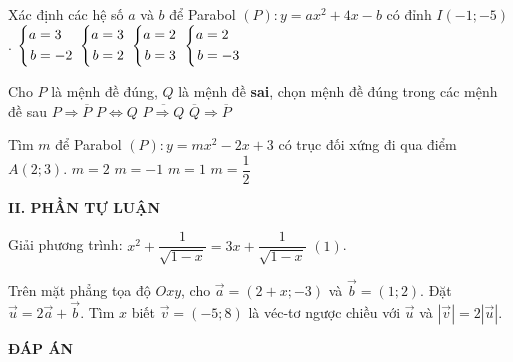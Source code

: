 \begin{ex}%
        Xác định các hệ số $a$ và $b$ để Parabol $(P): y= ax^2+4x-b$ có đỉnh $I(-1;-5)$.
        \choice        
        {$\left\{\begin{aligned}a&=3\\ b&=-2\end{aligned}\right.$}
        {$\left\{\begin{aligned}a&=3\\ b&=2\end{aligned}\right.$}
        {\True $\left\{\begin{aligned}a&=2\\ b&=3\end{aligned}\right.$}
        {$\left\{\begin{aligned}a&=2\\ b&=-3\end{aligned}\right.$}
\end{ex}
\begin{ex}%
        Cho $P$ là mệnh đề đúng, $Q$ là mệnh đề {\bf sai}, chọn mệnh đề đúng trong các mệnh đề sau
        \choice        
        {$P\Rightarrow \overline{P}$}
        {$P\Leftrightarrow Q$}
        {\True $\overline{P\Rightarrow Q}$}
        {$\overline{Q}\Rightarrow \overline{P}$}
\end{ex}
\begin{ex}%
        Tìm $m$ để Parabol $(P): y = mx^2-2x+3$ có trục đối xứng đi qua điểm $A(2;3)$.
        \choice        
        {$m=2$}
        {$m=-1$}
        {$m=1$}
        {\True $m=\dfrac{1}{2}$}
\end{ex}

\noindent\textbf{II. PHẦN TỰ LUẬN}
\begin{bt}
	Giải phương trình: $x^2+\dfrac{1}{\sqrt{1-x}}=3x+\dfrac{1}{\sqrt{1-x}}$ $(1)$.
\end{bt}
\begin{bt}
	Trên mặt phẳng tọa độ $Oxy$, cho $\vec{a}=(2+x;-3)$ và $\vec{b}=(1;2)$. Đặt $\vec{u}=2\vec{a}+\vec{b}$. Tìm $x$ biết $\vec{v}=(-5;8)$ là véc-tơ ngược chiều với $\vec{u}$ và $|\vec{v}|=2|\vec{u}|$.
\end{bt}
\newpage
\begin{center}
	\textbf{ĐÁP ÁN}
\end{center}
\begin{multicols}{10}
	
\end{multicols}

